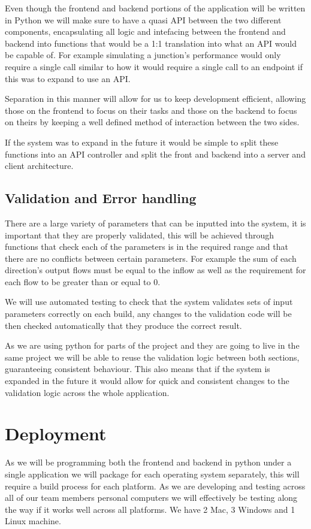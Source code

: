 \documentclass{article}
\begin{document}
Even though the frontend and backend portions of the application will be 
written in Python we will make sure to have a quasi API between the two 
different components, encapsulating all logic and intefacing between the 
frontend and backend into functions that would be a 1:1 translation into 
what an API would be capable of. For example simulating a junction's 
performance would only require a single call similar to how it would require 
a single call to an endpoint if this was to expand to use an API.

Separation in this manner will allow for us to keep development efficient, 
allowing those on the frontend to focus on their tasks and those on the 
backend to focus on theirs by keeping a well defined method of interaction 
between the two sides.

If the system was to expand in the future it would be simple to split these 
functions into an API controller and split the front and backend into a 
server and client architecture.

\subsection{Validation and Error handling}

There are a large variety of parameters that can be inputted into the system, it is 
important that they are properly validated, this will be achieved through functions 
that check each of the parameters is in the required range and that there are no 
conflicts between certain parameters. For example the sum of each direction's output 
flows must be equal to the inflow as well as the requirement for each flow to be 
greater than or equal to 0. 

We will use automated testing to check that the system validates sets of input 
parameters correctly on each build, any changes to the validation code will be then 
checked automatically that they produce the correct result. 

As we are using python for parts of the project and they are going to live 
in the same project we will be able to reuse the validation logic between both 
sections, guaranteeing consistent behaviour. This also means that if the system 
is expanded in the future it would allow for quick and consistent changes to the 
validation logic across the whole application.

\section{Deployment}
As we will be programming both the frontend and backend in python under a single 
application we will package for each operating system separately, this will require 
a build process for each platform. As we are developing and testing across all of 
our team members personal computers we will effectively be testing along the way 
if it works well across all platforms. We have 2 Mac, 3 Windows and 1 Linux machine.
\end{document}
